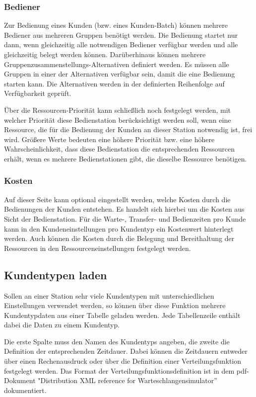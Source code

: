 \subsubsection*{Bediener}

Zur Bedienung eines Kunden (bzw. eines Kunden-Batch) können mehrere Bediener aus mehreren Gruppen benötigt werden. Die Bedienung
startet nur dann, wenn gleichzeitig alle notwendigen Bediener verfügbar werden und alle gleichzeitig belegt werden können.
Darüberhinaus können mehrere Gruppenzusammenstellungs-Alternativen definiert werden. Es müssen alle Gruppen in einer der
Alternativen verfügbar sein, damit die eine Bedienung starten kann. Die Alternativen werden in der definierten Reihenfolge
auf Verfügbarkeit geprüft. 

Über die Ressourcen-Priorität kann schließlich noch festgelegt werden, mit welcher Priorität diese Bedienstation
berücksichtigt werden soll, wenn eine Ressource, die für die Bedienung der Kunden an dieser Station notwendig ist,
frei wird. Größere Werte bedeuten eine höhere Priorität bzw. eine höhere Wahrscheinlichkeit, dass diese Bedienstation
die entsprechenden Ressourcen erhält, wenn es mehrere Bedienstationen gibt, die dieselbe Ressource benötigen.

\subsubsection*{Kosten}

Auf dieser Seite kann optional eingestellt werden, welche Kosten durch die Bedienungen der Kunden entstehen.
Es handelt sich hierbei um die Kosten aus Sicht der Bedienstation. Für die Warte-, Transfer- und Bedienzeiten pro
Kunde kann in den Kundeneinstellungen pro Kundentyp ein Kostenwert hinterlegt werden. Auch können die Kosten durch
die Belegung und Bereithaltung der Ressourcen in den Ressourceneinstellungen festgelegt werden.

\subsection*{Kundentypen laden}

Sollen an einer Station sehr viele Kundentypen mit unterschiedlichen Einstellungen verwendet werden, so können über diese Funktion mehrere Kundentypdaten aus einer Tabelle geladen werden. Jede Tabellenzeile enthält dabei die Daten zu einem Kundentyp.

Die erste Spalte muss den Namen des Kundentyps angeben, die zweite die Definition der entsprechenden Zeitdauer.
Dabei können die Zeitdauern entweder über einen Rechenausdruck oder über die Definition einer
Verteilungsfunktion festgelegt werden. Das Format der Verteilungsfunktionsdefinition ist in dem pdf-Dokument
"Distribution XML reference for Warteschlangensimulator'' dokumentiert.


